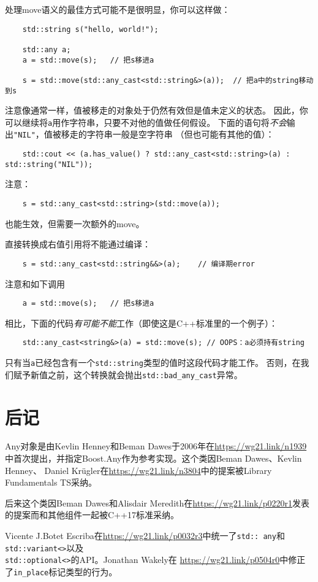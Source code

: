处理move语义的最佳方式可能不是很明显，你可以这样做：
\begin{lstlisting}
    std::string s("hello, world!");

    std::any a;
    a = std::move(s);   // 把s移进a

    s = std::move(std::any_cast<std::string&>(a));  // 把a中的string移动到s
\end{lstlisting}
注意像通常一样，值被移走的对象处于仍然有效但是值未定义的状态。
因此，你可以继续将\texttt{a}用作字符串，只要不对他的值做任何假设。
下面的语句将\emph{不会}输出\texttt{"NIL"}，值被移走的字符串一般是空字符串
（但也可能有其他的值）：
\begin{lstlisting}
    std::cout << (a.has_value() ? std::any_cast<std::string>(a) : std::string("NIL"));
\end{lstlisting}
注意：
\begin{lstlisting}
    s = std::any_cast<std::string>(std::move(a));
\end{lstlisting}
也能生效，但需要一次额外的move。

直接转换成右值引用将不能通过编译：
\begin{lstlisting}
    s = std::any_cast<std::string&&>(a);    // 编译期error
\end{lstlisting}
注意和如下调用
\begin{lstlisting}
    a = std::move(s);   // 把s移进a
\end{lstlisting}
相比，下面的代码\emph{有可能不能}工作（即使这是C++标准里的一个例子）：
\begin{lstlisting}
    std::any_cast<string&>(a) = std::move(s); // OOPS：a必须持有string
\end{lstlisting}
只有当\texttt{a}已经包含有一个\texttt{std::string}类型的值时这段代码才能工作。
否则，在我们赋予新值之前，这个转换就会抛出\texttt{std::bad\_any\_cast}异常。


\section{后记}
Any对象是由Kevlin Henney和Beman Dawes于2006年在\url{https://wg21.link/n1939}
中首次提出，并指定Boost.Any作为参考实现。这个类因Beman Dawes、Kevlin Henney、
Daniel Krügler在\url{https://wg21.link/n3804}中的提案被Library Fundamentals TS采纳。

后来这个类因Beman Dawes和Alisdair Meredith在\url{https://wg21.link/p0220r1}发表
的提案而和其他组件一起被C++17标准采纳。

Vicente J.Botet Escriba在\url{https://wg21.link/p0032r3}中统一了\texttt{std::
any}和\texttt{std::variant<>}以及\\
\texttt{std::optional<>}的API。Jonathan Wakely在
\url{https://wg21.link/p0504r0}中修正了\texttt{in\_place}标记类型的行为。